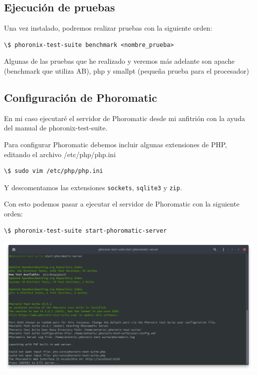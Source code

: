 \documentclass[12pt, spanish]{article}
\begin{document}
\subsection{Ejecución de pruebas}

Una vez instalado, podremos realizar pruebas con la siguiente orden:

\begin{verbatim}
\$ phoronix-test-suite benchmark <nombre_prueba>
\end{verbatim}

Algunas de las pruebas que he realizado y veremos más adelante son apache (benchmark que utiliza AB), php y smallpt (pequeña prueba para el procesador)


\subsection{Configuración de Phoromatic}

En mi caso ejecutaré el servidor de Phoromatic desde mi anfitrión con la ayuda del manual de phoronix-test-suite\cite{pts_man}.

Para configurar Phoromatic debemos incluir algunas extensiones de PHP, editando el archivo /etc/php/php.ini

\begin{verbatim}
\$ sudo vim /etc/php/php.ini
\end{verbatim}

Y descomentamos las extensiones \texttt{sockets}, \texttt{sqlite3} y \texttt{zip}.


Con esto podemos pasar a ejecutar el servidor de Phoromatic con la siguiente orden:

\begin{verbatim}
\$ phoronix-test-suite start-phoromatic-server
\end{verbatim}


\begin{center}
\includegraphics[scale=0.35]{phoromatic_server.png}
\end{center}
\end{document}
